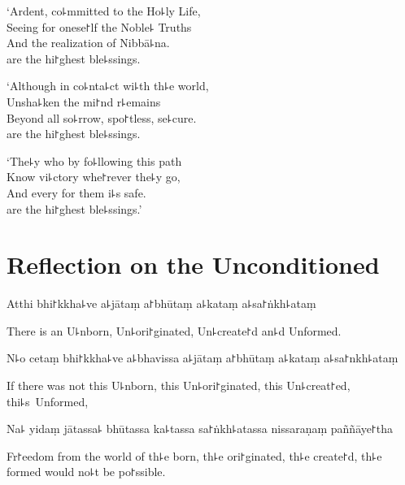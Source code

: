 \clearpage

`Ardent, co꜕mmitted to the Ho꜕ly Life,\\%
Seeing for onese꜓lf the Noble꜕ Truths\\
And the realization of Nibbā꜕na.\\
 are the hi꜓ghest ble꜕ssings.

`Although in co꜕nta꜕ct wi꜕th th꜕e world,\\
Unsha꜕ken the mi꜓nd r꜕emains\\
Beyond all so꜕rrow, spo꜓tless, se꜕cure.\\
 are the hi꜓ghest ble꜕ssings.

`The꜕y who  by fo꜕llowing this path\\
Know vi꜕ctory whe꜓rever the꜕y go,\\
And every  for them i꜕s safe.\\
 are the hi꜓ghest ble꜕ssings.'

\chapter[The Unconditioned]{Reflection on the Unconditioned}%


\begin{leader}
\end{leader}

Atthi bhi꜓kkha꜕ve a꜕jātaṃ a꜓bhūtaṃ a꜕kataṃ a꜕sa꜓ṅkh꜕ataṃ

\begin{english}
  There is an U꜕nborn, Un꜕ori꜓ginated, Un꜕create꜓d an꜕d Unformed.
\end{english}

N꜕o cetaṃ bhi꜓kkha꜕ve a꜕bhavissa a꜕jātaṃ a꜓bhūtaṃ a꜕kataṃ a꜕sa꜓nkh꜕ataṃ

\begin{english}
  If there was not this U꜕nborn, this Un꜕ori꜓ginated, this Un꜕creat꜓ed, thi꜕s~Unformed,
\end{english}

Na꜕ yidaṃ jātassa꜕ bhūtassa ka꜕tassa sa꜓ṅkh꜕atassa nissaraṇaṃ paññāye꜓tha

\begin{english}
  Fr꜓eedom from the world of th꜕e born, th꜕e ori꜓ginated, th꜕e create꜓d, th꜕e formed would no꜕t be po꜓ssible.
\end{english}

